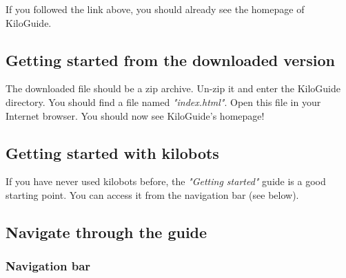 \documentclass[a4paper,12pt,titlepage]{scrartcl}
\begin{document}
If you followed the link above, you should already see the homepage of KiloGuide. 

\subsection{Getting started from the downloaded version}

The downloaded file should be a zip archive. Un-zip it and enter the KiloGuide directory. You should find a file named \emph{"index.html"}. Open this file in your Internet browser. You should now see KiloGuide's homepage!

\subsection{Getting started with kilobots}

If you have never used kilobots before, the \emph{"Getting started"} guide is a good starting point. You can access it from the navigation bar (see below).

\subsection{Navigate through the guide}

\begin{figure}[H]
\end{figure}

\subsubsection{Navigation bar}
\end{document}
